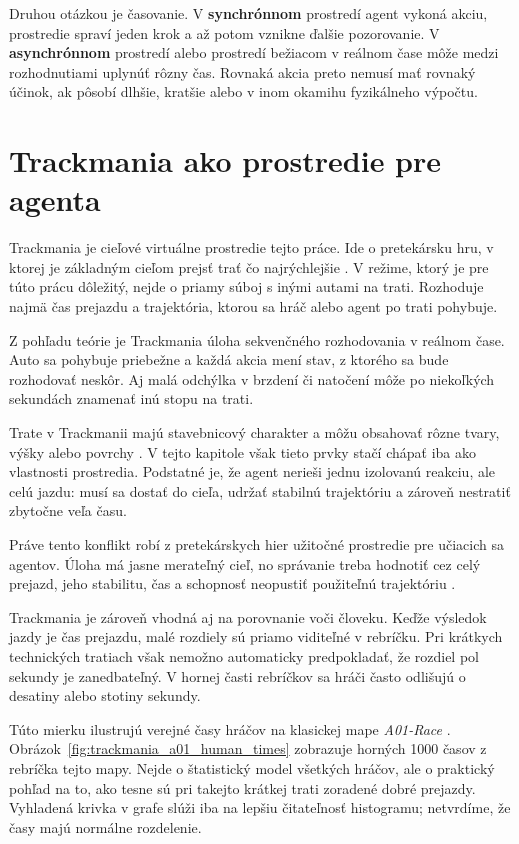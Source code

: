 Druhou otázkou je časovanie. V \textbf{synchrónnom} prostredí agent vykoná akciu, prostredie spraví jeden krok a až potom vznikne ďalšie pozorovanie. V \textbf{asynchrónnom} prostredí alebo prostredí bežiacom v reálnom čase môže medzi rozhodnutiami uplynúť rôzny čas. Rovnaká akcia preto nemusí mať rovnaký účinok, ak pôsobí dlhšie, kratšie alebo v inom okamihu fyzikálneho výpočtu.

\section{Trackmania ako prostredie pre agenta}

Trackmania je cieľové virtuálne prostredie tejto práce. Ide o pretekársku hru, v ktorej je základným cieľom prejsť trať čo najrýchlejšie \cite{ubisoft_trackmania2026}. V režime, ktorý je pre túto prácu dôležitý, nejde o priamy súboj s inými autami na trati. Rozhoduje najmä čas prejazdu a trajektória, ktorou sa hráč alebo agent po trati pohybuje.

Z pohľadu teórie je Trackmania úloha sekvenčného rozhodovania v reálnom čase. Auto sa pohybuje priebežne a každá akcia mení stav, z ktorého sa bude rozhodovať neskôr. Aj malá odchýlka v brzdení či natočení môže po niekoľkých sekundách znamenať inú stopu na trati.

Trate v Trackmanii majú stavebnicový charakter a môžu obsahovať rôzne tvary, výšky alebo povrchy \cite{trackmania_wiki2026}. V tejto kapitole však tieto prvky stačí chápať iba ako vlastnosti prostredia. Podstatné je, že agent nerieši jednu izolovanú reakciu, ale celú jazdu: musí sa dostať do cieľa, udržať stabilnú trajektóriu a zároveň nestratiť zbytočne veľa času.

Práve tento konflikt robí z pretekárskych hier užitočné prostredie pre učiacich sa agentov. Úloha má jasne merateľný cieľ, no správanie treba hodnotiť cez celý prejazd, jeho stabilitu, čas a schopnosť neopustiť použiteľnú trajektóriu \cite{offline_mania2024}.

Trackmania je zároveň vhodná aj na porovnanie voči človeku. Keďže výsledok jazdy je čas prejazdu, malé rozdiely sú priamo viditeľné v rebríčku. Pri krátkych technických tratiach však nemožno automaticky predpokladať, že rozdiel pol sekundy je zanedbateľný. V hornej časti rebríčkov sa hráči často odlišujú o desatiny alebo stotiny sekundy.

Túto mierku ilustrujú verejné časy hráčov na klasickej mape \emph{A01-Race} \cite{tmnf_exchange_a01_race2026, maniaexchange_api2026}. Obrázok~\ref{fig:trackmania_a01_human_times} zobrazuje horných 1000 časov z rebríčka tejto mapy. Nejde o štatistický model všetkých hráčov, ale o praktický pohľad na to, ako tesne sú pri takejto krátkej trati zoradené dobré prejazdy. Vyhladená krivka v grafe slúži iba na lepšiu čitateľnosť histogramu; netvrdíme, že časy majú normálne rozdelenie.

